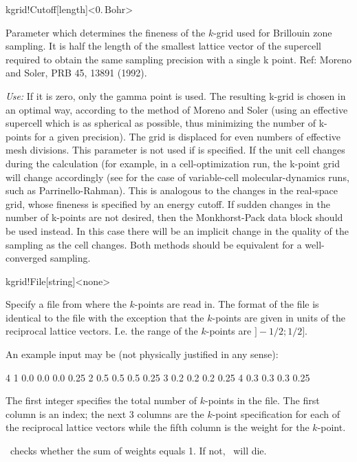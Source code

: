 \begin{fdfentry}{kgrid!Cutoff}[length]<$0.\,\mathrm{Bohr}$>

  Parameter which determines the fineness of the $k$-grid used for
  Brillouin zone sampling. It is half the length of the smallest
  lattice vector of the supercell required to obtain the same sampling
  precision with a single k point.  Ref: Moreno and Soler, PRB 45,
  13891 (1992).

  \textit{Use:} If it is zero, only the gamma point is used.  The resulting
  k-grid is chosen in an optimal way, according to the method of Moreno
  and Soler (using an effective supercell which is as spherical as
  possible, thus minimizing the number of k-points for a given
  precision). The grid is displaced for even numbers of effective mesh
  divisions.  This parameter is not used if 
  is specified. If the unit cell changes during the calculation (for
  example, in a cell-optimization run, the k-point
  grid will change accordingly (see  for the case
  of variable-cell molecular-dynamics runs, such as Parrinello-Rahman).
  This is analogous to the changes in the
  real-space grid, whose fineness is specified by an energy cutoff. If
  sudden changes in the number of k-points are not desired, then the
  Monkhorst-Pack data block should be used instead. In this case there
  will be an implicit change in the quality of the sampling as the cell
  changes. Both methods should be equivalent for a well-converged
  sampling.
  
\end{fdfentry}

\begin{fdfentry}{kgrid!File}[string]<none>

  Specify a file from where the $k$-points are read in.  The format of
  the file is identical to the  file with the exception
  that the $k$-points are given in units of the reciprocal lattice
  vectors. I.e. the range of the $k$-points are $]-1/2 ; 1/2]$.

  An example input may be (not physically justified in any sense):
  \begin{shellexample}
    4
    1 0.0 0.0 0.0 0.25
    2 0.5 0.5 0.5 0.25
    3 0.2 0.2 0.2 0.25
    4 0.3 0.3 0.3 0.25
  \end{shellexample}
  The first integer specifies the total number of $k$-points in the
  file.  The first column is an index; the next 3 columns are the
  $k$-point specification for each of the reciprocal lattice vectors
  while the fifth column is the weight for the $k$-point.

  \siesta\ checks whether the sum of weights equals 1. If not,
  \siesta\ will die.

\end{fdfentry}

